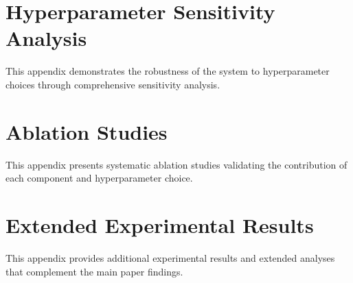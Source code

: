 \documentclass[10pt,letterpaper]{article}
\begin{document}
\section{Hyperparameter Sensitivity Analysis}
\label{appendix:hyperparameter_sensitivity}

This appendix demonstrates the robustness of the system to hyperparameter choices through comprehensive sensitivity analysis.



% 


\section{Ablation Studies}
\label{appendix:ablation_studies}

This appendix presents systematic ablation studies validating the contribution of each component and hyperparameter choice.




\section{Extended Experimental Results}
\label{appendix:extended_results}

This appendix provides additional experimental results and extended analyses that complement the main paper findings.



% 

% 
% 
% 
\end{document}
